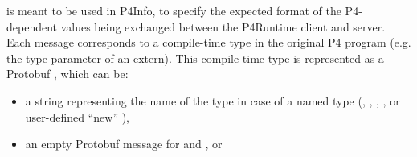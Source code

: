 \documentclass[11pt]{article}
\begin{document}
{%
 is meant to be used in P4Info, to specify the expected format
of the P4-dependent values being exchanged between the P4Runtime client and
server. Each  message corresponds to a compile-time type in the
original P4 program (e.g. the type parameter of an extern). This
compile-time type is represented as a Protobuf , which can be:%

\begin{itemize}%

\item{}
a string representing the name of the type in case of a named type (,
, , ,  or user-defined \textquotedblleft{}new\textquotedblright{}
),%

\item{}
an empty Protobuf message for  and , or%


\end{itemize}}
\end{document}
